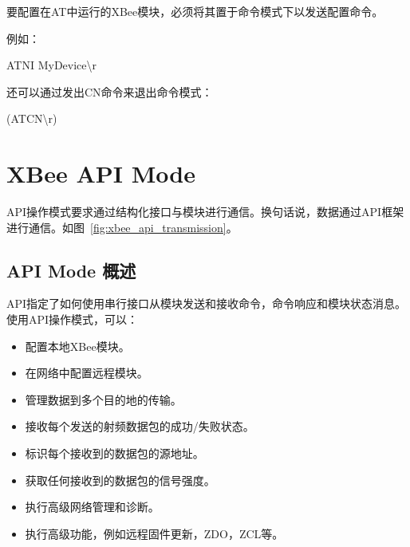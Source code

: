 
要配置在AT中运行的XBee模块，必须将其置于命令模式下以发送配置命令。





例如：

\begin{tcolorbox}
    ATNI MyDevice\textbackslash{}r
\end{tcolorbox}


还可以通过发出CN命令来退出命令模式：

\begin{tcolorbox}
    (ATCN\textbackslash{}r)
\end{tcolorbox}

\section{XBee API Mode}


API操作模式要求通过结构化接口与模块进行通信。换句话说，数据通过API框架进行通信。如图~\ref{fig:xbee_api_transmission}。

\subsection{API Mode 概述}

API指定了如何使用串行接口从模块发送和接收命令，命令响应和模块状态消息。使用API​​操作模式，可以：

\begin{itemize}
    \item 配置本地XBee模块。
    \item 在网络中配置远程模块。
    \item 管理数据到多个目的地的传输。
    \item 接收每个发送的射频数据包的成功/失败状态。
    \item 标识每个接收到的数据包的源地址。
    \item 获取任何接收到的数据包的信号强度。
    \item 执行高级网络管理和诊断。
    \item 执行高级功能，例如远程固件更新，ZDO，ZCL等。
\end{itemize}

